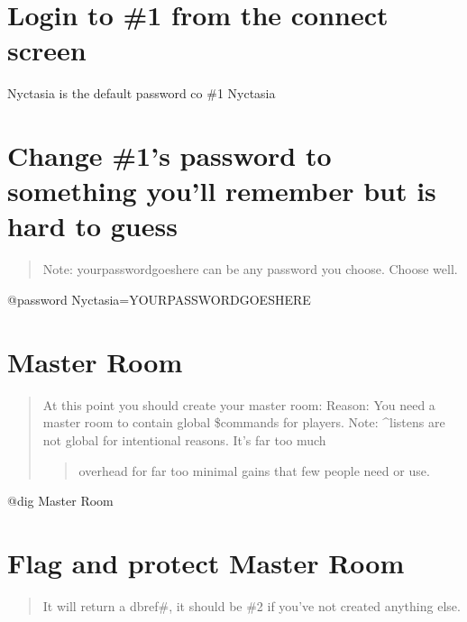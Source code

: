 \documentclass[letterpaper,10pt,english]{sphinxmanual}
\begin{document}
\section{Login to \#1 from the connect screen}
\label{\detokenize{05-newmush:login-to-1-from-the-connect-screen}}
\sphinxAtStartPar
Nyctasia is the default password
co \#1 Nyctasia


\section{Change \#1’s password to something you’ll remember but is hard to guess}
\label{\detokenize{05-newmush:change-1-s-password-to-something-you-ll-remember-but-is-hard-to-guess}}\begin{quote}

\sphinxAtStartPar
Note: yourpasswordgoeshere can be any password you choose.  Choose well.
\end{quote}

\sphinxAtStartPar
@password Nyctasia=YOURPASSWORDGOESHERE


\section{Master Room}
\label{\detokenize{05-newmush:master-room}}\begin{quote}

\sphinxAtStartPar
At this point you should create your master room:
Reason: You need a master room to contain global \$commands for players.
Note: \textasciicircum{}listens are not global for intentional reasons.  It’s far too much
\begin{quote}

\sphinxAtStartPar
overhead for far too minimal gains that few people need or use.
\end{quote}
\end{quote}

\sphinxAtStartPar
@dig Master Room


\section{Flag and protect Master Room}
\label{\detokenize{05-newmush:flag-and-protect-master-room}}\begin{quote}

\sphinxAtStartPar
It will return a dbref\#, it should be \#2 if you’ve not created anything else.
\end{quote}
\end{document}
